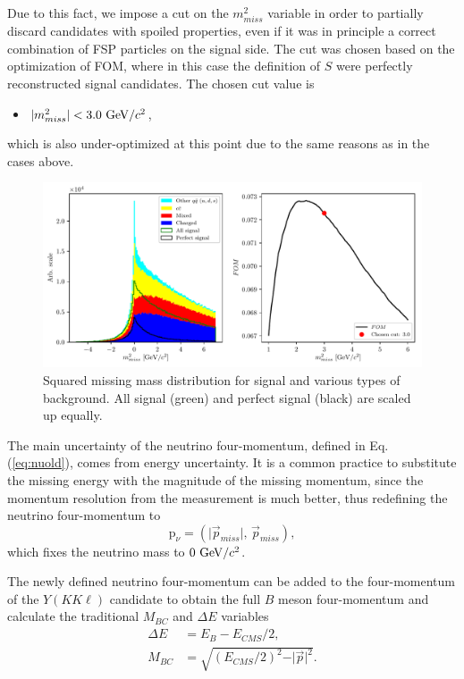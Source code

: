 Due to this fact, we impose a cut on the $m_{miss}^2$ variable in order to partially discard candidates with spoiled properties, even if it was in principle a correct combination of FSP particles on the signal side. The cut was chosen based on the optimization of FOM, where in this case the definition of $S$ were perfectly reconstructed signal candidates. The chosen cut value is 
\begin{itemize}
	\item $\vert m_{miss}^2 \vert < 3.0\mathrm{~GeV}/c^2$,
\end{itemize}
which is also under-optimized at this point due to the same reasons as in the cases above.


\begin{figure}[!htb]
	\centering
	\captionsetup{width=.8\linewidth}
	\includegraphics[width=\linewidth]{fig/missM2}
	\caption{Squared missing mass distribution for signal and various types of background. All signal (green) and perfect signal (black) are scaled up equally.}
	\label{fig:missm2}
\end{figure}

The main uncertainty of the neutrino four-momentum, defined in Eq. (\ref{eq:nuold}), comes from energy uncertainty. It is a common practice to substitute the missing energy with the magnitude of the missing momentum, since the momentum resolution from the measurement is much better, thus redefining the neutrino four-momentum to
\begin{equation}
\label{eq:nunew}
\mathrm{p}_\nu = \left(\vert \vec{p}_{miss} \vert,\,\vec{p}_{miss} \right),
\end{equation}
which fixes the neutrino mass to $0\mathrm{~GeV}/c^2$.

The newly defined neutrino four-momentum can be added to the four-momentum of the $Y(KK\ell)$ candidate to obtain the full $B$ meson four-momentum and calculate the traditional $M_{BC}$ and $\Delta E$ variables
\begin{align}
\label{eq:de}
\Delta E &= E_B - E_{CMS}/2,\\
M_{BC} &= \sqrt{\left(E_{CMS}/2\right)^2 - \vert \vec{p} \vert^2}.
\end{align}

